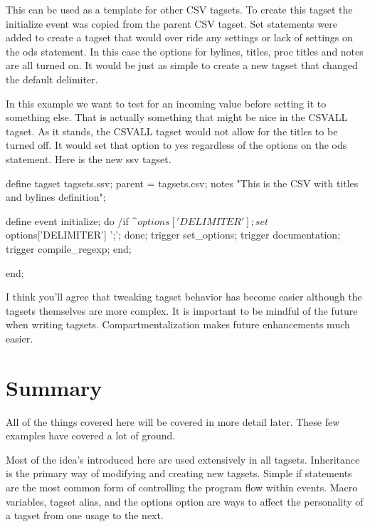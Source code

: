 This can be used as a template for other CSV tagsets.  To create this
tagset the initialize event was copied from the parent CSV tagset.
Set statements were added to create a tagset that would over ride any
settings or lack of settings on the ods statement.  In this case the
options for bylines, titles, proc titles and notes are all turned on.
It would be just as simple to create a new tagset that changed the default
delimiter.  

In this example we want to test for an incoming value before
setting it to something else.  That is actually something that might
be nice in the CSVALL tagset.  As it stands, the CSVALL tagset would
not allow for the titles to be turned off.  It would set that option
to yes regardless of the options on the ods statement.  Here is the
new ssv tagset.

\begin{sfvcode}
    define tagset tagsets.ssv;
        parent = tagsets.csv;
        notes "This is the CSV with titles and bylines definition";

        define event initialize;
            do /if ^$options['DELIMITER'];
                set $options['DELIMITER'] ';';
            done;
            trigger set_options;
            trigger documentation;
            trigger compile_regexp;
        end;

    end;
\end{sfvcode}

I think you'll agree that tweaking tagset behavior has become easier 
although the tagsets themselves are more complex.  
It is important to be mindful of the future when writing 
tagsets.  Compartmentalization makes future enhancements much easier.

\section{Summary}
All of the things covered here will be covered in more detail later.
These few examples have covered a lot of ground.

Most of the idea's introduced here are used extensively 
in all tagsets.  Inheritance is the primary way of modifying and creating
new tagsets.  Simple if statements are the most common form of controlling
the program flow within events.  Macro variables, tagset alias, and the
options option are ways to affect the personality of a tagset from one 
usage to the next.

